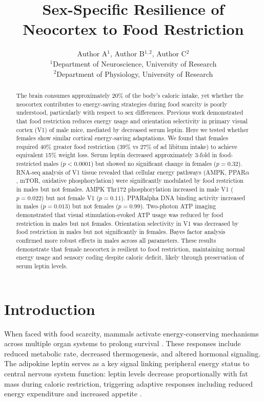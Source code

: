 \documentclass[11pt]{article}
\title{Sex-Specific Resilience of Neocortex to Food Restriction}
\author{Author A$^{1}$, Author B$^{1,2}$, Author C$^{2}$ \\
\small $^{1}$Department of Neuroscience, University of Research \\
\small $^{2}$Department of Physiology, University of Research}
\date{}
\begin{document}
\maketitle

\begin{abstract}
The brain consumes approximately 20\% of the body's caloric intake, yet whether the neocortex contributes to energy-saving strategies during food scarcity is poorly understood, particularly with respect to sex differences. Previous work demonstrated that food restriction reduces energy usage and orientation selectivity in primary visual cortex (V1) of male mice, mediated by decreased serum leptin. Here we tested whether females show similar cortical energy-saving adaptations. We found that females required 40\% greater food restriction (39\% vs 27\% of ad libitum intake) to achieve equivalent 15\% weight loss. Serum leptin decreased approximately 3-fold in food-restricted males ($p < 0.0001$) but showed no significant change in females ($p = 0.32$). RNA-seq analysis of V1 tissue revealed that cellular energy pathways (AMPK, PPAR$\alpha$, mTOR, oxidative phosphorylation) were significantly modulated by food restriction in males but not females. AMPK Thr172 phosphorylation increased in male V1 ($p = 0.022$) but not female V1 ($p = 0.11$). PPARalpha DNA binding activity increased in males ($p = 0.013$) but not females ($p = 0.99$). Two-photon ATP imaging demonstrated that visual stimulation-evoked ATP usage was reduced by food restriction in males but not females. Orientation selectivity in V1 was decreased by food restriction in males but not significantly in females. Bayes factor analysis confirmed more robust effects in males across all parameters. These results demonstrate that female neocortex is resilient to food restriction, maintaining normal energy usage and sensory coding despite caloric deficit, likely through preservation of serum leptin levels.
\end{abstract}

\section{Introduction}

When faced with food scarcity, mammals activate energy-conserving mechanisms across multiple organ systems to prolong survival \citep{wang2006,rosenbaum2010}. These responses include reduced metabolic rate, decreased thermogenesis, and altered hormonal signaling. The adipokine leptin serves as a key signal linking peripheral energy status to central nervous system function: leptin levels decrease proportionally with fat mass during caloric restriction, triggering adaptive responses including reduced energy expenditure and increased appetite \citep{friedman2019,ahima1996}.
\end{document}
